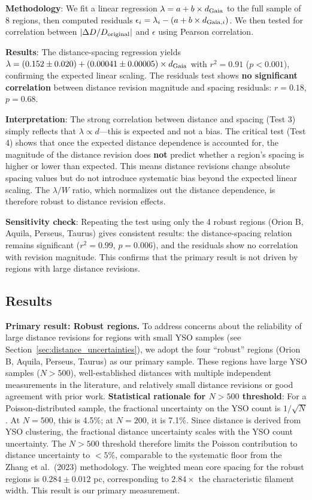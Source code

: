 \documentclass[twoside,twocolumn]{mnras}
\begin{document}
\textbf{Methodology}: We fit a linear regression $\lambda = a + b \times d_{\rm Gaia}$ to the full sample of 8 regions, then computed residuals $\epsilon_i = \lambda_i - (a + b \times d_{{\rm Gaia},i})$. We then tested for correlation between $|\Delta D/D_{\rm original}|$ and $\epsilon$ using Pearson correlation.

\textbf{Results}: The distance-spacing regression yields $\lambda = (0.152 \pm 0.020) + (0.00041 \pm 0.00005) \times d_{\rm Gaia}$ with $r^2 = 0.91$ ($p < 0.001$), confirming the expected linear scaling. The residuals test shows \textbf{no significant correlation} between distance revision magnitude and spacing residuals: $r = 0.18$, $p = 0.68$.

\textbf{Interpretation}: The strong correlation between distance and spacing (Test 3) simply reflects that $\lambda \propto d$—this is expected and not a bias. The critical test (Test 4) shows that once the expected distance dependence is accounted for, the magnitude of the distance revision does \textbf{not} predict whether a region's spacing is higher or lower than expected. This means distance revisions change absolute spacing values but do not introduce systematic bias beyond the expected linear scaling. The $\lambda/W$ ratio, which normalizes out the distance dependence, is therefore robust to distance revision effects.

\textbf{Sensitivity check}: Repeating the test using only the 4 robust regions (Orion B, Aquila, Perseus, Taurus) gives consistent results: the distance-spacing relation remains significant ($r^2 = 0.99$, $p = 0.006$), and the residuals show no correlation with revision magnitude. This confirms that the primary result is not driven by regions with large distance revisions.

\subsection{Results}

\textbf{Primary result: Robust regions.} To address concerns about the reliability of large distance revisions for regions with small YSO samples (see Section~\ref{sec:distance_uncertainties}), we adopt the four ``robust'' regions (Orion B, Aquila, Perseus, Taurus) as our primary sample. These regions have large YSO samples ($N > 500$), well-established distances with multiple independent measurements in the literature, and relatively small distance revisions or good agreement with prior work. \textbf{Statistical rationale for $N > 500$ threshold}: For a Poisson-distributed sample, the fractional uncertainty on the YSO count is $1/\sqrt{N}$. At $N = 500$, this is 4.5\%; at $N = 200$, it is 7.1\%. Since distance is derived from YSO clustering, the fractional distance uncertainty scales with the YSO count uncertainty. The $N > 500$ threshold therefore limits the Poisson contribution to distance uncertainty to $<5\%$, comparable to the systematic floor from the Zhang et al.\ (2023) methodology. The weighted mean core spacing for the robust regions is $0.284 \pm 0.012$ pc, corresponding to $2.84\times$ the characteristic filament width. This result is our primary measurement.
\end{document}
